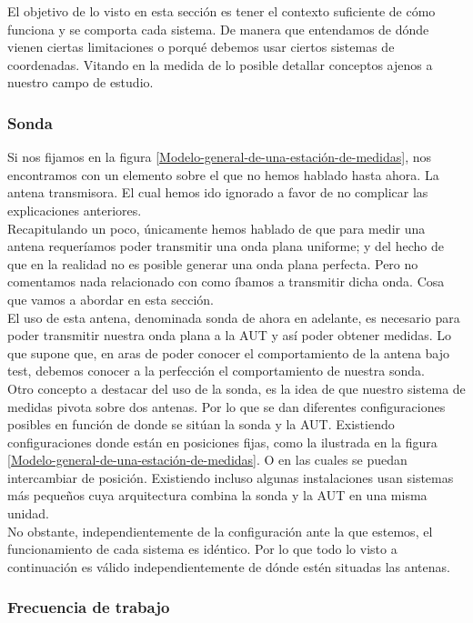 \documentclass{article}
\begin{document}
El objetivo de lo visto en esta sección es tener el contexto suficiente de cómo funciona y se comporta cada sistema. De manera que entendamos de dónde vienen ciertas limitaciones o porqué debemos usar ciertos sistemas de coordenadas. Vitando en la medida de lo posible detallar conceptos ajenos a nuestro campo de estudio. 

\subsubsection{Sonda} 

Si nos fijamos en la figura \ref{Modelo-general-de-una-estación-de-medidas}, nos encontramos con un elemento sobre el que no hemos hablado hasta ahora. La antena transmisora. El cual hemos ido ignorado a favor de no complicar las explicaciones anteriores.\\
Recapitulando un poco, únicamente hemos hablado de que para medir una antena requeríamos poder transmitir una onda plana uniforme; y del hecho de que en la realidad no es posible generar una onda plana perfecta. Pero no comentamos nada relacionado con como íbamos a transmitir dicha onda. Cosa que vamos a abordar en esta sección. 
\\

El uso de esta antena, denominada sonda de ahora en adelante, es necesario para poder transmitir nuestra onda plana a la AUT y así poder obtener medidas. Lo que supone que, en aras de poder conocer el comportamiento de la antena bajo test, debemos conocer a la perfección el comportamiento de nuestra sonda.
\\

Otro concepto a destacar del uso de la sonda, es la idea de que nuestro sistema de medidas pivota sobre dos antenas. Por lo que se dan diferentes configuraciones posibles en función de donde se sitúan la sonda y la AUT. Existiendo configuraciones donde están en posiciones fijas, como la ilustrada en la figura \ref{Modelo-general-de-una-estación-de-medidas}. O en las cuales se puedan intercambiar de posición. Existiendo incluso algunas instalaciones usan sistemas más pequeños cuya arquitectura combina la sonda y la AUT en una misma unidad. 
\\

No obstante, independientemente de la configuración ante la que estemos, el funcionamiento de cada sistema es idéntico. Por lo que todo lo visto a continuación es válido independientemente de dónde estén situadas las antenas. 

\subsubsection{Frecuencia de trabajo}
\end{document}
